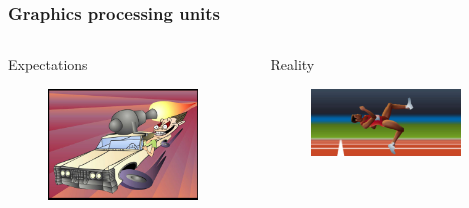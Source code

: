 \documentclass[8pt]{beamer}
\begin{document}
\begin{frame}
\frametitle{Graphics processing units}
\begin{columns}[c]
     \begin{column}[T]{5cm}
        Expectations
        \begin{figure}
        \includegraphics[width=150px]{img/expectations.jpg}
        \end{figure}
    \end{column}

    \begin{column}[T]{5cm}
        Reality
        \begin{figure}
        \includegraphics[width=150px]{img/reality.png}
        \end{figure}
    \end{column}
\end{columns}
\end{frame}
\fi
\end{document}
